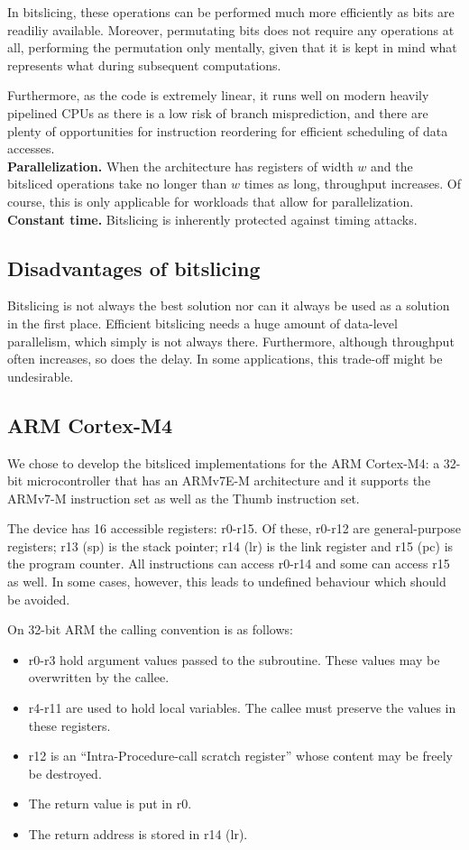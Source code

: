 \documentclass{report}
\begin{document}
In bitslicing, these operations can be performed much more efficiently as bits are readiliy available. Moreover, permutating bits does not require any operations at all, performing the permutation only mentally, given that it is kept in mind what represents what during subsequent computations.

Furthermore, as the code is extremely linear, it runs well on modern heavily pipelined CPUs as there is a low risk of branch misprediction, and there are plenty of opportunities for instruction reordering for efficient scheduling of data accesses.\\
\noindent\textbf{Parallelization.} When the architecture has registers of width $w$ and the bitsliced operations take no longer than $w$ times as long, throughput increases. Of course, this is only applicable for workloads that allow for parallelization.\\
\noindent\textbf{Constant time.} Bitslicing is inherently protected against timing attacks.\\

\subsection{Disadvantages of bitslicing}
Bitslicing is not always the best solution nor can it always be used as a solution in the first place. Efficient bitslicing needs a huge amount of data-level parallelism, which simply is not always there. Furthermore, although throughput often increases, so does the delay. In some applications, this trade-off might be undesirable.

\subsection{ARM Cortex-M4}
We chose to develop the bitsliced implementations for the ARM Cortex-M4: a 32-bit microcontroller that has an ARMv7E-M architecture and it supports the ARMv7-M instruction set as well as the Thumb instruction set.\cite{cortexm4datasheet}

The device has 16 accessible registers: r0-r15. Of these, r0-r12 are general-purpose registers; r13 (sp) is the stack pointer; r14 (lr) is the link register and r15 (pc) is the program counter. All instructions can access r0-r14 and some can access r15 as well. In some cases, however, this leads to undefined behaviour which should be avoided.

On 32-bit ARM the calling convention is as follows:
\begin{itemize}
    \setlength\itemsep{0em}
    \item r0-r3 hold argument values passed to the subroutine. These values may be overwritten by the callee.
    \item r4-r11 are used to hold local variables. The callee must preserve the values in these registers.
    \item r12 is an ``Intra-Procedure-call scratch register'' whose content may be freely be destroyed.
    \item The return value is put in r0.
    \item The return address is stored in r14 (lr).
\end{itemize}
\end{document}
